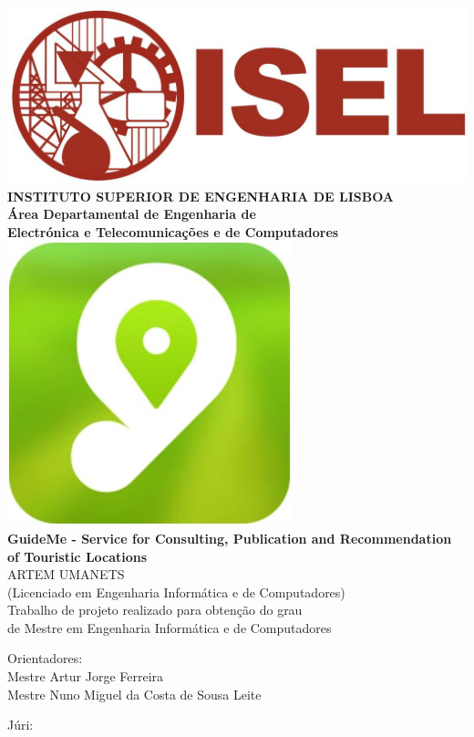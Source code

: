 \begin{titlepage}
	\begin{center}
		\includegraphics[width=5 cm]{./images/isel_logo.jpg} \\[0.5cm]
		{\Large \textbf{INSTITUTO SUPERIOR DE ENGENHARIA DE LISBOA}} \\[0.5cm]
		{\Large \textbf{Área Departamental de Engenharia de \\Electrónica e Telecomunica\c cões e de Computadores}} \\[0.8cm]		
		\includegraphics[height=3.5 cm]{./images/guide_me_logo.jpg} \\[0.8cm]
		\fontsize{18pt}{10pt}\selectfont
		{\textbf{GuideMe - Service for Consulting, Publication and Recommendation of Touristic Locations}} \\[0.8cm]
		\fontsize{16pt}{10pt}\selectfont
		ARTEM UMANETS\\[0.2cm]
		\fontsize{14pt}{10pt}\selectfont
		(Licenciado em Engenharia Informática e de Computadores)\\[0.8cm]
		\fontsize{12pt}{10pt}\selectfont
		{Trabalho de projeto realizado para obten\c cão do grau\\de Mestre em Engenharia Informática e de Computadores} \\[0.8cm]
		\vfill
		\begin{tabbing}
		   \fontsize{12pt}{10pt}\selectfont
		   Orientadores: \\
		   \fontsize{11pt}{10pt}\selectfont
		   \hspace{1.1cm}Mestre Artur Jorge Ferreira \\
		   \fontsize{11pt}{10pt}\selectfont
		   \hspace{1.1cm}Mestre Nuno Miguel da Costa de Sousa Leite \\
		\end{tabbing}
		\begin{tabbing}
		   \fontsize{12pt}{10pt}\selectfont
		   Júri: \\

\end{tabbing}
\end{center}
\end{titlepage}
